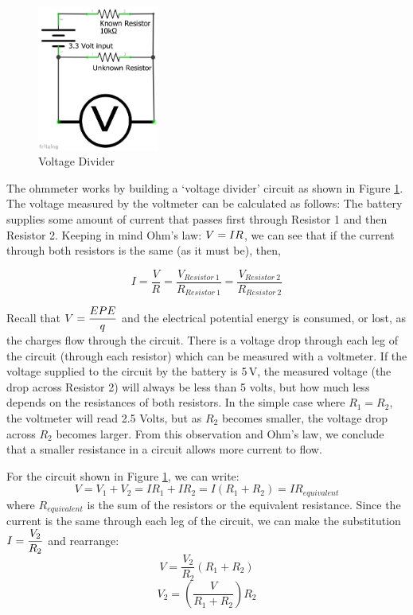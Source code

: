 \documentclass[]{article}
\begin{document}
	\begin{figure}%
		\centering
		\includegraphics[width=4cm]{pics/voltagedivider.png}
		\caption{Voltage Divider}
		\label{divider}
	\end{figure}

	The ohmmeter works by building a `voltage divider' circuit as shown in Figure \ref{divider}.  The voltage measured by the voltmeter can be calculated as follows:  The battery supplies  some amount of current that passes first through Resistor 1 and then Resistor 2.  Keeping in mind Ohm's law: $\displaystyle V=IR$, we can see that if the current through both resistors is the same (as it must be), then,

	\begin{equation}
		I = \frac{V}{R} = \frac{V_{Resistor\ 1}}{R_{Resistor\ 1}} = \frac{V_{Resistor\ 2}}{R_{Resistor\ 2}} 
	\end{equation}

	Recall that $\displaystyle V = \frac{EPE}{q}$ and the electrical potential energy is consumed, or lost, as the charges flow through the circuit.  There is a voltage drop through each leg of the circuit (through each resistor) which can be measured with a voltmeter. If the voltage supplied to the circuit by the battery is 5\,V, the  measured voltage (the drop across Resistor 2) will always be less than 5 volts, but how much less depends on the resistances of both resistors.  In the simple case where $R_1 = R_2$, the voltmeter will read 2.5 Volts, but as $R_2$ becomes smaller, the voltage drop across \(R_2\) becomes larger.  From this observation and Ohm's law, we conclude that a smaller resistance in a circuit allows more current to flow. 

  	For the circuit shown in Figure \ref{divider}, we can write:
	\begin{equation}
		V= V_1 + V_2 = IR_1 + IR_2 = I(R_1 +R_2) = IR_{equivalent}
	\end{equation}
	where $R_{equivalent}$ is the sum of the resistors or the equivalent resistance.  Since the current is the same through each leg of the circuit, we can make the substitution $\displaystyle I = \frac{V_2}{R_2}$ and rearrange:
	\begin{equation}
		V=\frac{V_2}{R_2}(R_1 +R_2)
		\label{voltage}
	\end{equation}
	\begin{equation}
		V_2=\left(\frac{V}{R_1+R_2}\right)R_2
		\label{VDiv}
	\end{equation}
\end{document}
